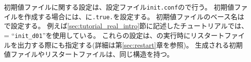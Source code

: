 初期値ファイルに関する設定は、設定ファイル\verb|init.conf|ので行う。
%
初期値ファイルを作成する場合には、に\verb|.true.|を設定する。
初期値ファイルのベース名はで設定する。
例えば\ref{sec:tutorial_real_intro}節に記述したチュートリアルでは、 = ``\verb|init_d01|''を使用している。
これらの設定は、\scalerm の実行時にリスタートファイルを出力する際にも指定する(詳細は第\ref{sec:restart}章を参照)。
生成される初期値ファイルやリスタートファイルは、同じ構造を持つ。


